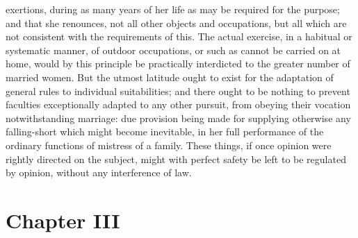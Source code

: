 \documentclass[12pt]{report}
\newcommand{\mychapter}[2]{
\setcounter{chapter}{#1}
    \setcounter{section}{0}
    \chapter*{#2}
    \addcontentsline{toc}{chapter}{#2}
}
\begin{document}
exertions, during as many years of her life as may be required for the purpose; and that she renounces, not all other objects and occupations, but all which are not consistent with the requirements of this. The actual exercise, in a habitual or systematic manner, of outdoor occupations, or such as cannot be carried on at home, would by this principle be practically interdicted to the greater number of married women. But the utmost latitude ought to exist for the adaptation of general rules to individual suitabilities; and there ought to be nothing to prevent faculties exceptionally adapted to any other pursuit, from obeying their vocation notwithstanding marriage: due provision being made for supplying otherwise any falling-short which might become inevitable, in her full performance of the ordinary functions of mistress of a family. These things, if once opinion were rightly directed on the subject, might with perfect safety be left to be regulated by opinion, without any interference of law.
\mychapter{3}{Chapter III}
\end{document}
